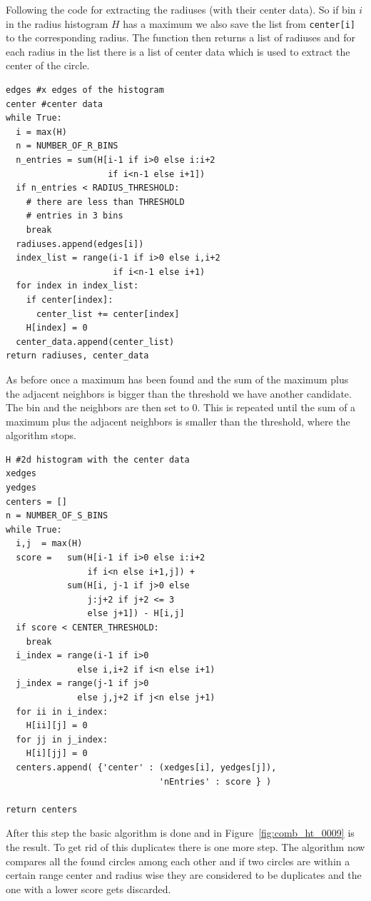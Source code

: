\documentclass[11pt,twoside]{scrreprt}
\begin{document}
Following the code for extracting the radiuses (with their center data). So if bin $i$ in the radius histogram $H$ has a maximum
we also save the list from \texttt{center[i]} to the corresponding radius. The function then returns a list of radiuses and for each
radius in the list there is a list of center data which is used to extract the center of the circle.
\begin{lstlisting}
edges #x edges of the histogram
center #center data
while True:
  i = max(H)
  n = NUMBER_OF_R_BINS
  n_entries = sum(H[i-1 if i>0 else i:i+2 
                    if i<n-1 else i+1])
  if n_entries < RADIUS_THRESHOLD:
    # there are less than THRESHOLD
    # entries in 3 bins
    break
  radiuses.append(edges[i])
  index_list = range(i-1 if i>0 else i,i+2 
                     if i<n-1 else i+1)
  for index in index_list:
    if center[index]:
      center_list += center[index]
    H[index] = 0
  center_data.append(center_list)    
return radiuses, center_data 
\end{lstlisting}
As before once a maximum has been found and the sum of the maximum plus the adjacent neighbors is bigger than the threshold we have another
candidate. The bin and the neighbors are then set to 0. This is repeated until the sum of a maximum plus the adjacent neighbors is smaller
than the threshold, where the algorithm stops.
\begin{lstlisting}
H #2d histogram with the center data
xedges 
yedges 
centers = []
n = NUMBER_OF_S_BINS
while True:
  i,j  = max(H)
  score =   sum(H[i-1 if i>0 else i:i+2 
                if i<n else i+1,j]) + 
            sum(H[i, j-1 if j>0 else
                j:j+2 if j+2 <= 3 
                else j+1]) - H[i,j]
  if score < CENTER_THRESHOLD:
    break
  i_index = range(i-1 if i>0 
              else i,i+2 if i<n else i+1)
  j_index = range(j-1 if j>0 
              else j,j+2 if j<n else j+1)
  for ii in i_index:
    H[ii][j] = 0  
  for jj in j_index:
    H[i][jj] = 0
  centers.append( {'center' : (xedges[i], yedges[j]), 
                              'nEntries' : score } )

return centers
\end{lstlisting}

After this step the basic algorithm is done and in Figure~\ref{fig:comb_ht_0009} is the result. To get rid of this duplicates there is one more step.
The algorithm now compares all the found circles among each other and if two circles are within a certain range center and radius wise
they are considered to be duplicates and the one with a lower score gets discarded.
\end{document}
